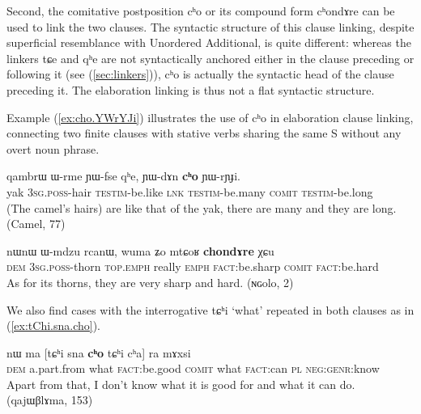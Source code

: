 \documentclass[oldfontcommands,oneside,a4paper,11pt]{article}
\newcommand{\ipa}[1]{{\phon \mbox{#1}}} %
\newcommand{\refb}[1]{(\ref{#1})}
\begin{document}
Second,  the comitative postposition \ipa{cʰo} or its compound form  \ipa{cʰondɤre} can be used to link the two clauses. The syntactic structure of this clause linking, despite superficial resemblance with Unordered Additional, is quite different: whereas the linkers \ipa{tɕe} and \ipa{qʰe} are not syntactically anchored either in the clause preceding or following it (see \refb{sec:linkers}), \ipa{cʰo} is actually the syntactic head of the clause preceding it. The elaboration linking is thus not a flat syntactic structure.



Example \refb{ex:cho.YWrYJi} illustrates the use of \ipa{cʰo} in elaboration clause linking, connecting two finite clauses with stative verbs sharing the same S without any overt noun phrase.

\begin{exe}
\ex \label{ex:cho.YWrYJi}
\gll
\ipa{qambrɯ}  	\ipa{ɯ-rme}  	\ipa{ɲɯ-fse}  	\ipa{qʰe,}  	\ipa{ɲɯ-dɤn}  	\ipa{\textbf{cʰo}}  	\ipa{ɲɯ-rɲɟi.}  \\
yak \textsc{3sg.poss}-hair \textsc{testim}-be.like \textsc{lnk} \textsc{testim}-be.many \textsc{comit} \textsc{testim}-be.long \\
\glt (The camel's hairs) are like that of the yak, there are many and they are long. (Camel, 77)
\end{exe}

\begin{exe}
\ex \label{ex:chondAre}
\gll
\ipa{nɯnɯ}  	\ipa{ɯ-mdzu}  	\ipa{rcanɯ,}  	\ipa{wuma}  	\ipa{ʑo}  	\ipa{mtɕoʁ}  	\ipa{\textbf{chondɤre}}  	\ipa{χɕu}  \\
\textsc{dem} \textsc{3sg.poss}-thorn \textsc{top.emph} really \textsc{emph} \textsc{fact}:be.sharp \textsc{comit} \textsc{fact}:be.hard \\
\glt As for its thorns, they are very sharp and hard. (ɴɢolo, 2)
\end{exe}

We also find cases with the interrogative  \ipa{tɕʰi} `what' repeated in both clauses as  in \refb{ex:tChi.sna.cho}.

\begin{exe}
\ex \label{ex:tChi.sna.cho}
\gll
\ipa{nɯ}  	\ipa{ma}  	[\ipa{tɕʰi}  	\ipa{sna}  	\ipa{\textbf{cʰo}}  	\ipa{tɕʰi}  	\ipa{cʰa}]  	\ipa{ra}  	\ipa{mɤxsi}  \\
\textsc{dem} a.part.from what \textsc{fact}:be.good \textsc{comit} what \textsc{fact}:can \textsc{pl} \textsc{neg:genr}:know\\
\glt Apart from that, I don't know what it is good for and what it can do. (qajɯβlɤma, 153)
\end{exe}
\end{document}
